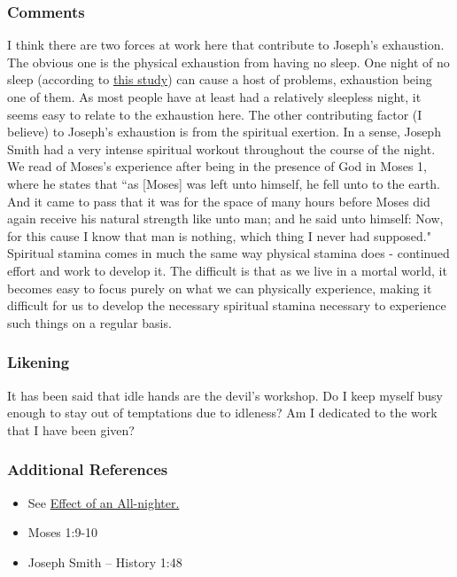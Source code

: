 \documentclass[12pt]{report}
\begin{document}
\subsubsection{Comments\label{js:comments15}}
I think there are two forces at work here that contribute to Joseph's exhaustion.  The obvious one is the physical exhaustion from having no sleep.  One night of no sleep (according to \href{https://www.sciencealert.com/here-s-what-happens-to-your-body-when-you-stay-up-all-night}{this study}) can cause a host of problems, exhaustion being one of them.  As most people have at least had a relatively sleepless night, it seems easy to relate to the exhaustion here.  The other contributing factor (I believe) to Joseph's exhaustion is from the spiritual exertion.  In a sense, Joseph Smith had a very intense spiritual workout throughout the course of the night.  We read of Moses's experience after being in the presence of God in Moses 1, where he states that ``as [Moses] was left unto himself, he fell unto to the earth.  And it came to pass that it was for the space of many hours before Moses did again receive his natural strength like unto man; and he said unto himself: Now, for this cause I know that man is nothing, which thing I never had supposed."  Spiritual stamina comes in much the same way physical stamina does - continued effort and work to develop it.  The difficult is that as we live in a mortal world, it becomes easy to focus purely on what we can physically experience, making it difficult for us to develop the necessary spiritual stamina necessary to experience such things on a regular basis.

\subsubsection{Likening\label{js:likening15}}
It has been said that idle hands are the devil's workshop.  Do I keep myself busy enough to stay out of temptations due to idleness?  Am I dedicated to the work that I have been given?

\subsubsection{Additional References\label{js:references15}}
\begin{itemize}
\item See \href{https://www.sciencealert.com/here-s-what-happens-to-your-body-when-you-stay-up-all-night}{Effect of an All-nighter.}
\item Moses 1:9-10
\item Joseph Smith -- History 1:48
\end{itemize}
\end{document}
